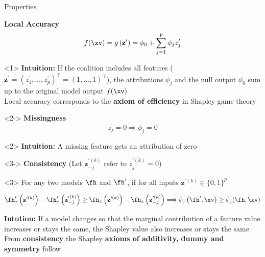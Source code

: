 \documentclass[11pt,compress,t,notes=noshow, aspectratio=169, xcolor=table]{beamer}
\begin{document}
\begin{frame}{Properties}

\textbf{Local Accuracy}
$$
f(\xv)=g\left(\mathbf{z}^{\prime}\right)=\phi_{0}+\sum_{j=1}^{p} \phi_{j} z_{j}^{\prime}
$$

\begin{onlyenv}<1>
\textbf{Intuition:} If the coalition includes all features ($\mathbf{z}^{\prime} = (z^{\prime}_1, \dots, z^{\prime}_p)^\top = (1, \dots, 1)^\top $), the attributions $\phi_j$ and the null output $\phi_0$ sum up to the original model output $f(\xv)$\\\medskip
Local accuracy corresponds to the \textbf{axiom of efficiency} in Shapley game theory

\end{onlyenv}

\begin{onlyenv}<2->
\textbf{Missingness}
$$
z_{j}^{\prime}=0 \Longrightarrow \phi_{j}=0
$$
\end{onlyenv}

\begin{onlyenv}<2>
\textbf{Intuition:}  A missing feature gets an attribution of zero
\end{onlyenv}

\begin{onlyenv}<3->
\textbf{Consistency} (Let $\mathbf{z}^{\prime (k)}_{-j} \text{ refer to } z_{j}^{\prime (k)}=0$) \\
\end{onlyenv}

\begin{onlyenv}<3>
For any two models $\fh$ and $\fh^{\prime}$, if for all inputs $\mathbf{z}^{\prime (k)} \in \{0, 1\}^p$

$$
\fh_{x}^{\prime}\left(\mathbf{z}^{\prime (k)}\right)-\fh_{x}^{\prime}\left(\mathbf{z}^{\prime (k)}_{-j}\right) \geq \fh_{x}\left(\mathbf{z}^{\prime (k)}\right)-\fh_{x}\left(\mathbf{z}^{\prime (k)} _{-j}\right) \Longrightarrow \phi_{j}\left(\fh^{\prime}, \xv\right) \geq \phi_{j}(\fh, \xv)
$$

\textbf{Intution:} If a model changes so that the marginal contribution of a feature value increases or stays the same, the Shapley value also increases or stays the same\\\medskip
From \textbf{consistency} the Shapley \textbf{axioms of additivity, dummy and symmetry} follow
\end{onlyenv}


\end{frame}
\end{document}
